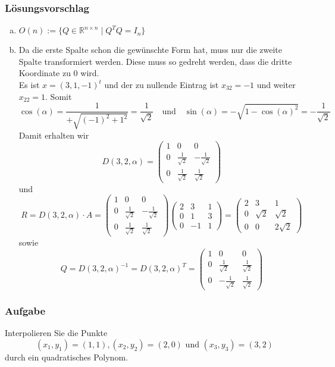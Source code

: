 \documentclass[a4paper,11pt]{scrartcl}
\newcounter{auf}
\newcommand{\Aufgabe}%
        {\addtocounter{auf}{1} \subsubsection*{\rmfamily  Aufgabe \theauf \hspace{1em}} }
\newcommand{\RR}{\mathbb{R}}
\begin{document}
\subsubsection*{Lösungsvorschlag}
\begin{enumerate}[a)]
\item $O(n):=\{Q \in \RR^{n\times n} \mid Q^TQ=I_n\}$
\item Da die erste Spalte schon die gewünschte Form hat, muss nur die zweite Spalte transformiert werden. Diese muss so gedreht werden, dass die dritte Koordinate zu 0 wird.\\
Es ist $x=(3,1,-1)^t$ und der zu nullende Eintrag ist $x_{32}=-1$ und weiter $x_{22}=1$. Somit
$$
\cos(\alpha)=\frac{1}{+\sqrt{(-1)^2+1^2}}=\frac{1}{\sqrt{2}} \quad \text{und} \quad \sin(\alpha)=-\sqrt{1-\cos(\alpha)^2}=-\frac{1}{\sqrt{2}}
$$
Damit erhalten wir
$$
D(3,2,\alpha)=\begin{pmatrix}1&0&0\\0&\frac{1}{\sqrt{2}}&-\frac{1}{\sqrt{2}}\\0&\frac{1}{\sqrt{2}}&\frac{1}{\sqrt{2}} \end{pmatrix}
$$
und
$$
R=D(3,2,\alpha)\cdot A =\begin{pmatrix}1&0&0\\0&\frac{1}{\sqrt{2}}&-\frac{1}{\sqrt{2}}\\0&\frac{1}{\sqrt{2}}&\frac{1}{\sqrt{2}} \end{pmatrix}\begin{pmatrix}2&3&1\\0&1&3\\0&-1&1 \end{pmatrix}
=\begin{pmatrix}2&3&1\\0&\sqrt{2}&\sqrt{2}\\0&0& 2\sqrt{2}\end{pmatrix}
$$
sowie
$$
Q=D(3,2,\alpha)^{-1}=D(3,2,\alpha)^T=\begin{pmatrix}1&0&0\\0&\frac{1}{\sqrt{2}}&\frac{1}{\sqrt{2}}\\0&-\frac{1}{\sqrt{2}}&\frac{1}{\sqrt{2}} \end{pmatrix}
$$
\end{enumerate}



\newpage
\Aufgabe
Interpolieren Sie die Punkte
$$
(x_1,y_1)=(1,1), (x_2,y_2)=(2,0) \text{ und } (x_3,y_3)=(3,2)
$$
durch ein quadratisches Polynom.
%
%
\end{document}
